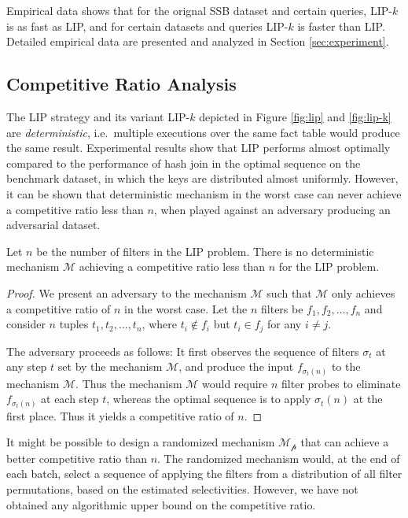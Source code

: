 Empirical data shows that for the orignal SSB dataset and certain queries, LIP-$k$ is as fast as LIP, and for certain datasets and queries LIP-$k$ is faster than LIP. Detailed empirical data are presented and analyzed in Section \ref{sec:experiment}.



\subsection{Competitive Ratio Analysis}

The LIP strategy and its variant LIP-$k$ depicted in Figure \ref{fig:lip} and \ref{fig:lip-k} are \textit{deterministic}, i.e.\ multiple executions over the same fact table would produce the same result. Experimental results show that LIP performs almost optimally compared to the performance of hash join in the optimal sequence \cite{zhu2017looking} on the benchmark dataset, in which the keys are distributed almost uniformly. However, it can be shown that deterministic mechanism in the worst case can never achieve a competitive ratio less than $n$, when played against an adversary producing an adversarial dataset.


\begin{theorem}
	Let $n$ be the number of filters in the LIP problem. There is no deterministic mechanism $\mathcal{M}$ achieving a competitive ratio less than $n$ for the \textsc{LIP} problem.
\end{theorem}

\begin{proof}
	We present an adversary to the mechanism $\mathcal{M}$ such that $\mathcal{M}$ only achieves a competitive ratio of $n$ in the worst case. Let the $n$ filters be $f_1, f_2, \dots, f_n$ and consider $n$ tuples $t_1, t_2, \dots, t_n$, where $t_i \notin f_i$ but $t_i \in f_j$ for any $i \neq j$.

	The adversary proceeds as follows: It first observes the sequence of filters $\sigma_t$ at any step $t$ set by the mechanism $\mathcal{M}$, and produce the input $f_{\sigma_t(n)}$ to the mechanism $\mathcal{M}$. Thus the mechanism $\mathcal{M}$ would require $n$ filter probes to eliminate $f_{\sigma_t(n)}$ at each step $t$, whereas the optimal sequence is to apply $\sigma_t(n)$ at the first place. Thus it yields a competitive ratio of $n$.
\end{proof}


It might be possible to design a randomized mechanism $\mathcal{M_p}$ that can achieve a better competitive ratio than $n$. The randomized mechanism would, at the end of each batch, select a sequence of applying the filters from a distribution of all filter permutations, based on the estimated selectivities. However, we have not obtained any algorithmic upper bound on the competitive ratio.  


